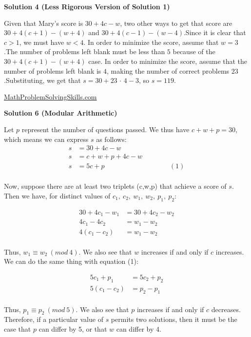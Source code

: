 \begin{enumerate}
\textbf{Solution 4 (Less Rigorous Version of Solution 1)}

Given that Mary's score is $30+4c-w$, two other ways to get that score are $30+4(c+1)-(w+4)$ and $30+4(c-1)-(w-4)$.Since it is clear that $c>1$, we must have $w<4$. In order to minimize the score, assume that $w=3$.The number of problems left blank must be less than $5$ because of the $30+4(c+1)-(w+4)$ case. In order to minimize the score, assume that the number of problems left blank is $4$, making the number of correct problems $23$.Substituting, we get that $s=30+23{\,\cdot\,}4-3$, so $s=\boxed{119}$.

 \href{https://mathproblemsolvingskills.wordpress.com/}{MathProblemSolvingSkills.com}

 



\textbf{Solution 6 (Modular Arithmetic)}

Let $p$ represent the number of questions passed. We thus have $c+w+p=30$, which means we can express $s$ as follows:
 \begin{align*} s&=30+4c-w \\ s&=c+w+p+4c-w\\ s&=5c+p \hspace{4cm} (1)\\ \end{align*}


 Now, suppose there are at least two triplets (c,w,p) that achieve a score of $s$. Then we have, for distinct values of $c_1, \ c_2, \ w_1, \ w_2, \ p_1, \ p_2$:

 
 \begin{align*} 30+4c_1-w_1&=30+4c_2-w_2 \\ 4c_1-4c_2&=w_1-w_2\\ 4(c_1-c_2)&=w_1-w_2\\ \end{align*}


 Thus, $w_1 \equiv w_2 \ (mod \ 4)$. We also see that $w$ increases if and only if $c$ increases. We can do the same thing with equation (1):

 
 \begin{align*} 5c_1+p_1 &= 5c_2+p_2\\ 5(c_1-c_2)&=p_2-p_1\\ \end{align*}


 Thus, $p_1 \equiv p_2 \ (mod \ 5)$. We also see that $p$ increases if and only if $c$ decreases. Therefore, if a particular value of $s$ permits two solutions, then it must be the case that $p$ can differ by 5, or that $w$ can differ by 4.


\end{enumerate}
